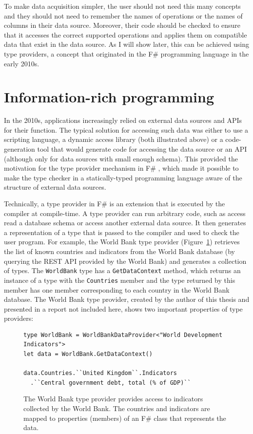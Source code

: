 \documentclass[fleqn,11pt]{report}
\theoremstyle{definition}
\begin{document}
To make data acquisition simpler, the user should not need this many concepts and they should not
need to remember the names of operations or the names of columns in their data source.
Moreover, their code should be checked to ensure that it accesses the correct supported
operations and applies them on compatible data that exist in the data source. As I will show later,
this can be achieved using type providers, a concept that originated in the F\# programming language
in the early 2010s.

\section{Information-rich programming}
In the 2010s, applications increasingly relied on external data sources and APIs for their
function. The typical solution for accessing such data was either to use a scripting language,
a dynamic access library (both illustrated above) or a code-generation tool that would generate
code for accessing the data source or an API (although only for data sources with small enough
schema). This provided the motivation for the type provider mechanism in F\#
\citep{syme-2012-providers,syme-2013-inforich}, which made it possible to make the type checker
in a statically-typed programming language aware of the structure of external data sources.

Technically, a type provider in F\# is an extension that is executed by the compiler at
compile-time. A type provider can run arbitrary code, such as access read a database schema or
access another external data source. It then generates a representation of a type that is
passed to the compiler and used to check the user program. For example, the World Bank
type provider (Figure~\ref{fig:wb}) retrieves the list of known countries and indicators from
the World Bank database (by querying the REST API provided by the World Bank) and generates
a collection of types. The \texttt{WorldBank} type has a \texttt{GetDataContext} method, which
returns an instance of a type with the \texttt{Countries} member and the type returned by this
member has one member corresponding to each country in the World Bank database.
The World Bank type provider, created by the author of this thesis and presented in a report
\citep{syme-2012-providers} not included here, shows two important properties of type providers:

\begin{figure}[t]
\begin{lstlisting}[language=sharp]
type WorldBank = WorldBankDataProvider<"World Development Indicators">
let data = WorldBank.GetDataContext()

data.Countries.``United Kingdom``.Indicators
  .``Central government debt, total (% of GDP)``
\end{lstlisting}
\vspace{-0.5em}
\caption{The World Bank type provider \citep{syme-2012-providers} provides access to indicators
collected by the World Bank. The countries and indicators are mapped to properties (members)
of an F\# class that represents the data.}
\vspace{-0.5em}
\label{fig:wb}
\end{figure}
\end{document}
